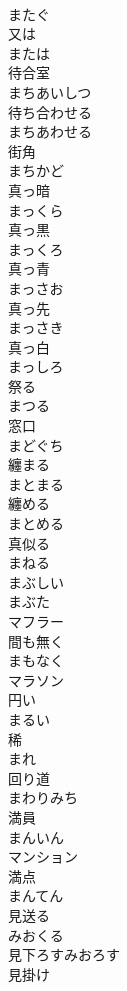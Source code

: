 \documentclass[8pt]{extreport}
\begin{document}
\begin{CJK}{UTF8}{min}
\\	またぐ	
\\	又は 
\\	または	
\\	待合室 
\\	まちあいしつ	
\\	待ち合わせる 
\\	まちあわせる	
\\	街角 
\\	まちかど	
\\	真っ暗 
\\	まっくら	
\\	真っ黒 
\\	まっくろ	
\\	真っ青 
\\	まっさお	
\\	真っ先 
\\	まっさき	
\\	真っ白 
\\	まっしろ	
\\	祭る 
\\	まつる	
\\	窓口 
\\	まどぐち	
\\	纏まる 
\\	まとまる	
\\	纏める 
\\	まとめる	
\\	真似る 
\\	まねる	
\\	まぶしい	
\\	まぶた	
\\	マフラー	
\\	間も無く 
\\	まもなく	
\\	マラソン	
\\	円い 
\\	まるい	
\\	稀 
\\	まれ	
\\	回り道 
\\	まわりみち	
\\	満員 
\\	まんいん	
\\	マンション	
\\	満点 
\\	まんてん	
\\	見送る 
\\	みおくる	
\\	見下ろすみおろす	
\\	見掛け 

\end{CJK}
\end{document}
